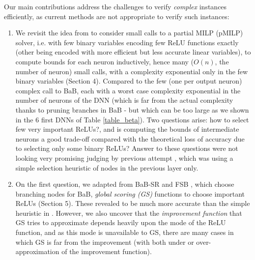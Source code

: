 Our main contributions address the challenges to verify {\em complex} instances efficiently, as current methods are not appropriate to verify such instances:
\begin{enumerate}
	
	\item We revisit the idea from \cite{DivideAndSlide} to consider small calls to a partial MILP (pMILP) solver, i.e. with few binary variables encoding few ReLU functions exactly (other being encoded with more efficient but less accurate linear variables), to compute bounds for each neuron inductively, hence many ($O(n)$, the number of neuron) small calls, with a complexity exponential only in the few binary variables (Section 4). Compared to the few (one per output neuron) complex call to BaB, each with a worst case complexity exponential in the number of neurons of the DNN (which is far from the actual complexity thanks to pruning branches in BaB - but which can be too large as we shown in the 6 first DNNs of Table \ref{table_beta}). Two questions arise: how to select few very important ReLUs?, and is computing the bounds of intermediate neurons a good trade-off compared with the theoretical loss of accuracy due to selecting only some binary ReLUs? Answer to these questions were not looking very promising judging by previous attempt \cite{DivideAndSlide}, which was using a simple selection heuristic of nodes in the previous layer only.

	\item On the first question, we adapted from BaB-SR \cite{BaB} and FSB \cite{FSB}, which choose branching nodes for BaB, {\em global scoring ({\sf GS})} functions to choose important ReLUs (Section 5). These revealed to be much more accurate than the simple heuristic in 
	\cite{DivideAndSlide}. However, we also uncover that the {\em improvement function} that {\sf GS} tries to approximate depends heavily upon the mode of the ReLU function, and as this mode is unavailable to {\sf GS}, there are many cases in which {\sf GS} is far from the improvement (with both under or over-approximation of the improvement function). 


\end{enumerate}
